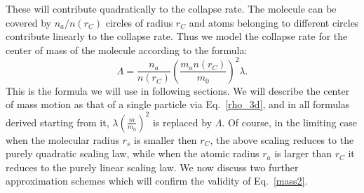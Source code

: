 \documentclass[12pt,groupedaddress,pra,aps]{revtex4-1}
\begin{document}
These will contribute quadratically to the collapse rate.  The molecule can be covered by $n_a/n(r_C)$ circles of radius $r_C$ and atoms belonging to different circles contribute linearly to the collapse rate. Thus we model the collapse rate for the center of mass of the molecule according to the formula:
\begin{equation}\label{mass2}
\Lambda= \frac{n_a}{n(r_C)} \left(\frac{m_a n(r_C)}{m_0} \right)^2\lambda.
\end{equation}
This is the formula we will use in following sections. We will describe the center of mass motion as that of a single particle via Eq.~\eqref{rho_3d}, and in all formulas derived starting from it, $\lambda \left(\frac{m}{m_0}\right)^2$ is replaced by $\Lambda$. Of course, in the limiting case when the molecular radius $r_s$ is smaller then $r_C$, the above scaling reduces to the purely quadratic scaling law, while when the atomic radius $r_a$ is larger than $r_C$ it reduces to the purely linear scaling law. 
We now discuss two further approximation schemes which will confirm the validity of Eq.~\eqref{mass2}.
\\ \\
\end{document}
